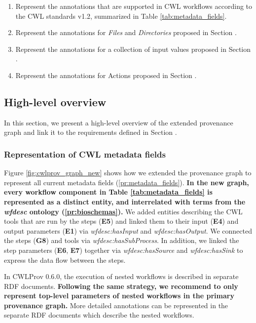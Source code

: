 \begin{enumerate}[label=\textbf{PR\arabic*}]
    \item \label{pr:metadata_fields} Represent the annotations that are supported in CWL workflows according to the CWL standards v1.2, summarized in Table \ref{tab:metadata_fields}.
    \item \label{pr:input} Represent the annotations for \emph{Files} and \emph{Directories} proposed in Section \emph{}.
    \item \label{pr:execution} Represent the annotations for a collection of input values proposed in Section \emph{}.
    \item \label{pr:actions} Represent the annotations for Actions proposed in Section \emph{}.
\end{enumerate}

\subsection{High-level overview}
\label{sec:ext_overview}
In this section, we present a high-level overview of the extended provenance graph and link it to the requirements defined in Section \emph{}.

\subsubsection{Representation of CWL metadata fields}



Figure \ref{fig:cwlprov_graph_new} shows how we extended the provenance graph to represent all current metadata fields (\ref{pr:metadata_fields}). \textbf{In the new graph, every workflow component in Table \ref{tab:metadata_fields} is represented as a distinct entity, and interrelated with terms from the \emph{wfdesc} ontology (\ref{pr:bioschemas}).} 
We added entities describing the CWL tools that are run by the steps (\textbf{E5}) and linked them to their input (\textbf{E4}) and output parameters (\textbf{E1}) via \emph{wfdesc:hasInput} and \emph{wfdesc:hasOutput}. We connected the steps (\textbf{G8}) and tools via \emph{wfdesc:hasSubProcess}. In addition, we linked the step parameters (\textbf{E6}, \textbf{E7}) together via \emph{wfdesc:hasSource} and \emph{wfdesc:hasSink} to express the data flow between the steps.

In CWLProv 0.6.0, the execution of nested workflows is described in separate RDF documents. \textbf{Following the same strategy, we recommend to only represent top-level parameters of nested workflows in the primary provenance graph.} More detailed annotations can be represented in the separate RDF documents which describe the nested workflows.

